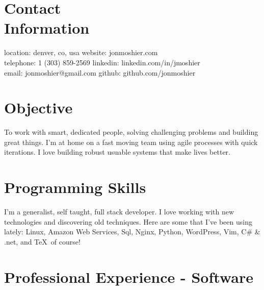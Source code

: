 \documentclass[margin,line]{resume}
\begin{document}
\begin{resume}

    \section{\mysidestyle Contact\\Information}
    location: denver, co, usa   \hfill website: jonmoshier.com\vspace{0mm}\\\vspace{0mm}%
    telephone: 1 (303) 859-2569 \hfill linkedin: linkedin.com/in/jmoshier\vspace{0mm}\\\vspace{0mm}%
    email: jonmoshier@gmail.com \hfill github: github.com/jonmoshier\vspace{0mm}\\\vspace{-4.5mm}%

    \section{\mysidestyle Objective}
 
To work with smart, dedicated people, solving challenging problems and building great things. I'm at home on a fast moving team using agile processes with quick iterations. I love building robust usuable systems that make lives better.
    \section{\mysidestyle Programming Skills} 
	I'm a generalist, self taught, full stack developer. I love working with new technologies and discovering old techniques. Here are some that I've been using lately: Linux, Amazon Web Services, Sql, Nginx, Python, WordPress, Vim, C\# \& .net, and \TeX\ of course!
\section{\mysidestyle Professional Experience - Software}


\end{resume}
\end{document}
